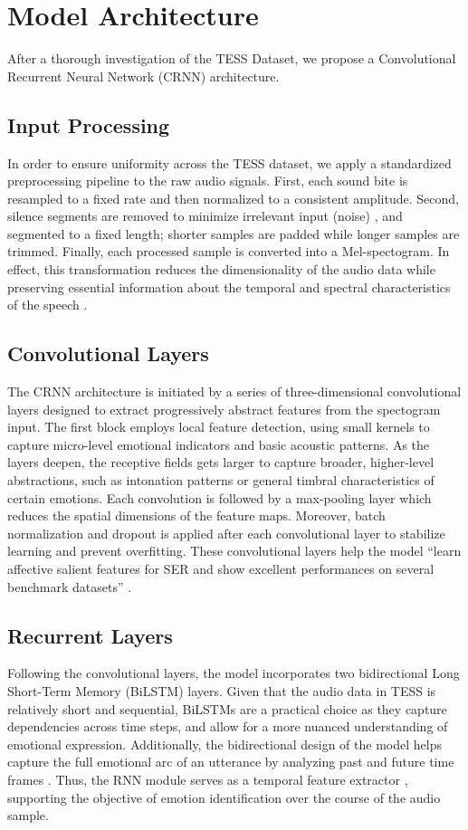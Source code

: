 \documentclass[../main.tex]{subfiles}
\begin{document}
\section{Model Architecture}
After a thorough investigation of the TESS Dataset, we propose a Convolutional
Recurrent Neural Network (CRNN) architecture.

\subsection{Input Processing}
In order to ensure uniformity across the TESS dataset, we apply a standardized
preprocessing pipeline to the raw audio signals. First, each sound bite is
resampled to a fixed rate and then normalized to a consistent amplitude. Second,
silence segments are removed to minimize irrelevant input (noise) \citep{Orhan2021}, and segmented
to a fixed length; shorter samples are padded while longer samples are trimmed.
Finally, each processed sample is converted into a Mel-spectogram. In effect,
this transformation reduces the dimensionality of the audio data while
preserving essential information about the temporal and spectral characteristics
of the speech \citep{Orhan2021}.

\subsection{Convolutional Layers}
The CRNN architecture is initiated by a series of three-dimensional convolutional
layers designed to extract progressively abstract features from the spectogram
input. The first block employs local feature detection, using small kernels to
capture micro-level emotional indicators and basic acoustic patterns. As the
layers deepen, the receptive fields gets larger to capture broader, higher-level
abstractions, such as intonation patterns or general timbral characteristics of
certain emotions. Each convolution is followed by a max-pooling layer which
reduces the spatial dimensions of the feature maps. Moreover, batch
normalization and dropout is applied after each convolutional layer to stabilize
learning and prevent overfitting. These convolutional layers help the model ``learn affective salient features for SER and show excellent performances on several benchmark datasets'' \citep{Chen2018}.

\subsection{Recurrent Layers}
Following the convolutional layers, the model incorporates two bidirectional
Long Short-Term Memory (BiLSTM) layers. Given that the audio data in TESS is
relatively short and sequential, BiLSTMs are a practical choice as they capture
dependencies across time steps, and allow for a more nuanced understanding of
emotional expression. Additionally, the bidirectional design of the model helps
capture the full emotional arc of an utterance by analyzing past and future time
frames \citep{Orhan2021}. Thus, the RNN module serves as a temporal feature extractor \citep{Chen2018}, supporting
the objective of emotion identification over the course of the audio sample.
\end{document}
